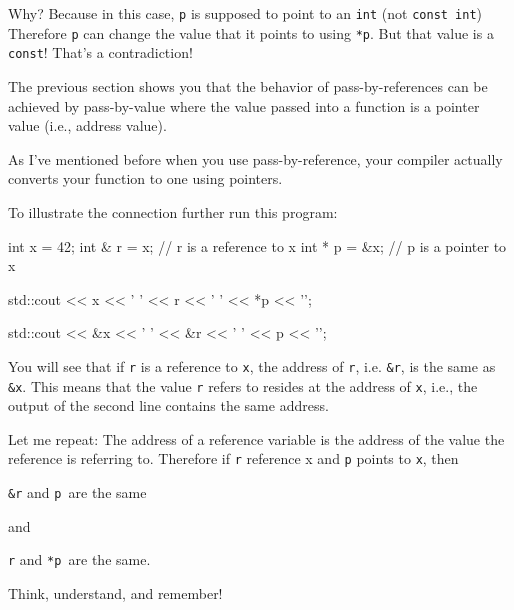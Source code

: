 Why? Because in this case, \texttt{p} is supposed to point to an \texttt{int} (not \texttt{const int}) Therefore \texttt{p} can change the value that it points to using \texttt{*p}. But that value is a \texttt{const}! That's a contradiction!






\newpage{}

The previous section shows you that the behavior of pass-by-references can be achieved by pass-by-value where the value passed into a function is a pointer value (i.e., address value).

As I've mentioned before when you use pass-by-reference, your compiler actually converts your function to one using pointers.

To illustrate the connection further run this program:

\begin{consolethree}[escapeinside=||]
int x = 42;
int & r = x;    // r is a reference to x
int * p = &x;   // p is a pointer to x

std::cout << x << ' ' << r << ' ' << *p << '\n';

std::cout << &x << ' ' << &r << ' ' << p << '\n';
\end{consolethree}
You will see that if \texttt{r} is a reference to \texttt{x}, the address of \texttt{r}, i.e. \texttt{\&r}, is the same as \texttt{\&x}. This means that the value \texttt{r} refers to resides at the address of \texttt{x}, i.e., the output of the second line contains the same address.

Let me repeat: The address of a reference variable is the address of the value the reference is referring to. Therefore if \texttt{r} reference x and \texttt{p} points to \texttt{x}, then

\texttt{\&r} and \texttt{p }are the same

and

\texttt{r} and \texttt{*p }are the same.

Think, understand, and remember!

\newpage{}

